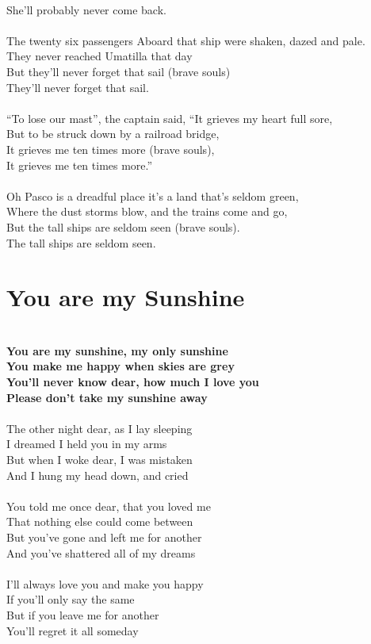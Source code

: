 \documentclass[letterpaper,9pt]{article}
\begin{document}
\\She'll probably never come back.
\\
\\The twenty six passengers Aboard that ship were shaken, dazed and pale.
\\They never reached Umatilla that day
\\But they'll never forget that sail (brave souls)
\\They'll never forget that sail.
\\
\\“To lose our mast”, the captain said, “It grieves my heart full sore,
\\But to be struck down by a railroad bridge,
\\It grieves me ten times more (brave souls),
\\It grieves me ten times more.”
\\
\\Oh Pasco is a dreadful place it's a land that's seldom green,
\\Where the dust storms blow, and the trains come and go,
\\But the tall ships are seldom seen (brave souls).
\\The tall ships are seldom seen.

\newpage
\section{You are my Sunshine}
\huge
\noindent
\\\textbf{You are my sunshine, my only sunshine
\\You make me happy when skies are grey
\\You'll never know dear, how much I love you
\\Please don't take my sunshine away}
\\
\\The other night dear, as  I lay sleeping
\\I dreamed I held you in my arms
\\But when I woke dear, I was mistaken
\\And I hung my head down, and cried
\\
\\You told me once dear, that you loved me
\\That nothing else could come between
\\But you've gone and left me for another
\\And you've shattered all of my dreams
\\
\\I'll always love you and make you happy 
\\If you'll only say the same
\\But if you leave me for another
\\You'll regret it all someday
\end{document}
